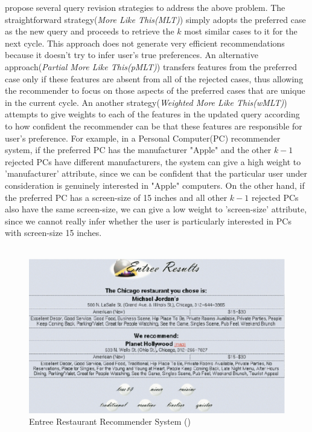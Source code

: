 \cite{comparisonbr} propose several query revision strategies to address the above problem.
The straightforward strategy(\textit{More Like This(MLT)}) simply adopts the preferred case as the new query and proceeds to retrieve the $k$ most similar cases to it for the next cycle.
This approach does not generate very efficient recommendations because it doesn't try to infer user's true preferences.
An alternative approach(\textit{Partial More Like This(pMLT)}) transfers features from the preferred case only if these features are absent from all of the rejected cases, thus allowing the recommender to focus on those aspects of the preferred cases that are unique in the current cycle.
An another strategy(\textit{Weighted More Like This(wMLT)}) attempts to give weights to each of the features in the updated query according to how confident the recommender can be that these features are responsible for user's preference.
For example, in a Personal Computer(PC) recommender system, if the preferred PC has the manufacturer "Apple" and the other $k-1$ rejected PCs have different manufacturers, the system can give a high weight to 'manufacturer' attribute, since we can be confident that the particular user under consideration is genuinely interested in "Apple" computers.
On the other hand, if the preferred PC has a screen-size of 15 inches and all other $k-1$ rejected PCs also have the same screen-size, we can give a low weight to 'screen-size' attribute, since we cannot really infer whether the user is particularly interested in PCs with screen-size 15 inches.\\
\\
\begin{figure}
    \includegraphics[width=1.0\textwidth]{figures-bharath/entree.pdf}
  \caption{Entree Restaurant Recommender System (\cite{entree})}
  \centering
\label{fig:entree}
\end{figure}
